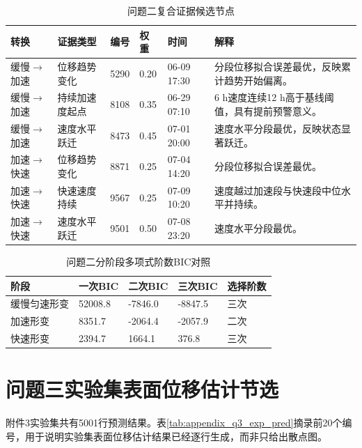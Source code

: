 \begin{table}[H]
\centering
\footnotesize
\caption{问题二复合证据候选节点}
\label{tab:appendix_q2_candidates}
\begin{tabularx}{0.98\textwidth}{L{2.1cm}L{2.5cm}L{1.3cm}L{1.2cm}L{2.7cm}X}
\toprule
转换 & 证据类型 & 编号 & 权重 & 时间 & 解释 \\
\midrule
缓慢$\to$加速 & 位移趋势变化 & 5290 & 0.20 & 06-09 17:30 & 分段位移拟合误差最优，反映累计趋势开始偏离。 \\
缓慢$\to$加速 & 持续加速度起点 & 8108 & 0.35 & 06-29 07:10 & 6 h速度连续12 h高于基线阈值，具有提前预警意义。 \\
缓慢$\to$加速 & 速度水平跃迁 & 8473 & 0.45 & 07-01 20:00 & 速度水平分段最优，反映状态显著跃迁。 \\
加速$\to$快速 & 位移趋势变化 & 8871 & 0.25 & 07-04 14:20 & 分段位移拟合误差最优。 \\
加速$\to$快速 & 快速速度持续 & 9567 & 0.25 & 07-09 10:20 & 速度越过加速段与快速段中位水平并持续。 \\
加速$\to$快速 & 速度水平跃迁 & 9501 & 0.50 & 07-08 23:20 & 速度水平分段最优。 \\
\bottomrule
\end{tabularx}
\end{table}

\begin{table}[H]
\centering
\small
\caption{问题二分阶段多项式阶数BIC对照}
\label{tab:appendix_q2_bic}
\begin{tabular}{L{2.4cm}L{2.0cm}L{2.0cm}L{2.0cm}L{1.8cm}}
\toprule
阶段 & 一次BIC & 二次BIC & 三次BIC & 选择阶数 \\
\midrule
缓慢匀速形变 & 52008.8 & -7846.0 & -8847.5 & 三次 \\
加速形变 & 8351.7 & -2064.4 & -2057.9 & 二次 \\
快速形变 & 2394.7 & 1664.1 & 376.8 & 三次 \\
\bottomrule
\end{tabular}
\end{table}

\section{问题三实验集表面位移估计节选}

附件3实验集共有5001行预测结果。表\ref{tab:appendix_q3_exp_pred}摘录前20个编号，用于说明实验集表面位移估计结果已经逐行生成，而非只给出散点图。

